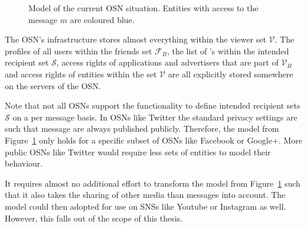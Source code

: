 \begin{figure}
\begin{center}
{
    }
    \end{center}
    \caption{Model of the current OSN situation. Entities with access to the message $m$ are coloured blue.}
    \label{fig:current_model}
\end{figure}

The OSN's infrastructure stores almost everything within the viewer set $\mathcal{V}$. The profiles of all users within the friends set $\mathcal{F}_B$, the list of \id{}'s within the intended recipient set $\mathcal{S}$, access rights of applications and advertisers that are part of $\mathcal{V}_B$ and access rights of entities within the set $\mathcal{V}$ are all explicitly stored somewhere on the servers of the OSN.

Note that not all OSNs support the functionality to define intended recipient sets $\mathcal{S}$ on a per message basis. In OSNs like Twitter the standard privacy settings are such that message are always published publicly. Therefore, the model from Figure~\ref{fig:current_model} only holds for a specific subset of OSNs like Facebook or Google+. More public OSNs like Twitter would require less sets of entities to model their behaviour.

It requires almost no additional effort to transform the model from Figure~\ref{fig:current_model} such that it also takes the sharing of other media than messages into account. The model could then adopted for use on SNSs like Youtube or Instagram as well. However, this falls out of the scope of this thesis.

